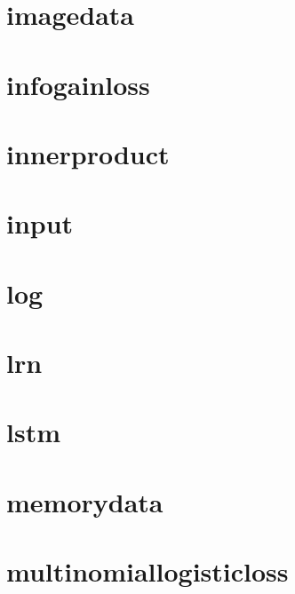 \documentclass[twoside]{book}
\newcommand{\+}{\discretionary{\mbox{\scriptsize$\hookleftarrow$}}{}{}}
\begin{document}
\chapter{imagedata}
\label{md_docs_tutorial_layers_imagedata}

\chapter{infogainloss}
\label{md_docs_tutorial_layers_infogainloss}

\chapter{innerproduct}
\label{md_docs_tutorial_layers_innerproduct}

\chapter{input}
\label{md_docs_tutorial_layers_input}

\chapter{log}
\label{md_docs_tutorial_layers_log}

\chapter{lrn}
\label{md_docs_tutorial_layers_lrn}

\chapter{lstm}
\label{md_docs_tutorial_layers_lstm}

\chapter{memorydata}
\label{md_docs_tutorial_layers_memorydata}

\chapter{multinomiallogisticloss}
\label{md_docs_tutorial_layers_multinomiallogisticloss}

\end{document}
